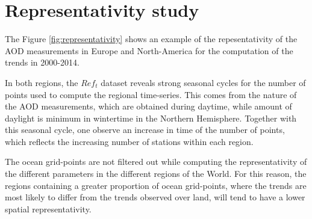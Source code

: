 \documentclass[journal abbreviation, manuscript]{copernicus}
\begin{document}




\appendix
\section{Representativity study} \label{sec:representativity} %

The Figure \ref{fig:representativity} shows an example of the repesentativity of the AOD measurements in Europe and North-America for the computation of the trends in 2000-2014.

In both regions, the $Ref_{t}$ dataset reveals strong seasonal cycles for the number of points used to compute the regional time-series. This comes from the nature of the AOD measurements, which are obtained during daytime, while amount of daylight is minimum in wintertime in the Northern Hemisphere. Together with this seasonal cycle, one observe an increase in time of the number of points, which reflects the increasing number of stations within each region.

The ocean grid-points are not filtered out while computing the representativity of the different parameters in the different regions of the World. For this reason, the regions containing a greater proportion of ocean grid-points, where the trends are most likely to differ from the trends observed over land, will tend to have a lower spatial representativity.

\subsection{}     %


\noappendix       %



\end{document}
